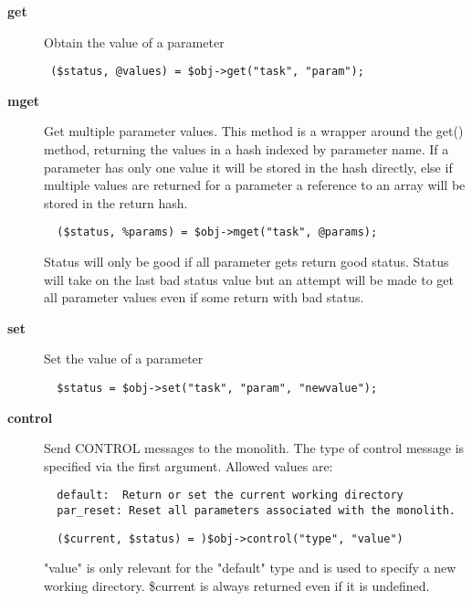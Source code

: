 \begin{description}
\begin{description}
\item[{\textbf{get}}] \mbox{}

Obtain the value of a parameter

\begin{verbatim}
 ($status, @values) = $obj->get("task", "param");
\end{verbatim}

\item[{\textbf{mget}}] \mbox{}

Get multiple parameter values. This method is a wrapper around
the get() method, returning the values in a hash indexed
by parameter name. If a parameter has only one value it will
be stored in the hash directly, else if multiple values are
returned for a parameter a reference to an array will be stored
in the return hash.

\begin{verbatim}
  ($status, %params) = $obj->mget("task", @params);
\end{verbatim}


Status will only be good if all parameter gets return good
status. Status will take on the last bad status value but
an attempt will be made to get all parameter values even if
some return with bad status.


\item[{\textbf{set}}] \mbox{}

Set the value of a parameter

\begin{verbatim}
  $status = $obj->set("task", "param", "newvalue");
\end{verbatim}

\item[{\textbf{control}}] \mbox{}

Send CONTROL messages to the monolith. The type of control
message is specified via the first argument. Allowed values are:

\begin{verbatim}
  default:  Return or set the current working directory
  par_reset: Reset all parameters associated with the monolith.
\end{verbatim}
\begin{verbatim}
  ($current, $status) = )$obj->control("type", "value")
\end{verbatim}


"value" is only relevant for the "default" type and is used
to specify a new working directory. \$current is always returned
even if it is undefined.




\end{description}
\end{description}
